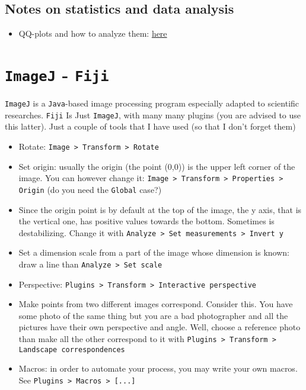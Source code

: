 \documentclass[a4paper,12pt,%
              final%
              ]{article}
\begin{document}
\subsection{Notes on statistics and data analysis}
\begin{itemize}
  \item QQ-plots and how to analyze them: \href{https://www.ucd.ie/ecomodel/Resources/QQplots_WebVersion.html}{here}
\end{itemize}
\section{\texttt{ImageJ} - \texttt{Fiji}}
\texttt{ImageJ} is a \texttt{Java}-based image processing program especially adapted to scientific researches. \texttt{Fiji} Is Just \texttt{ImageJ}, with many many plugins (you are advised to use this latter). Just a couple of tools that I have used (so that I don't forget them)
\begin{itemize}
  \item Rotate: \texttt{Image > Transform > Rotate}
  \item Set origin: usually the origin (the point (0,0)) is the upper left corner of the image. You can however change it: \texttt{Image > Transform > Properties > Origin} (do you need the \texttt{Global} case?)
  \item Since the origin point is by default at the top of the image, the y axis, that is the vertical one, has positive values towards the bottom. Sometimes is destabilizing. Change it with \texttt{Analyze > Set measurements > Invert y}
  \item Set a dimension scale from a part of the image whose dimension is known: draw a line than \texttt{Analyze > Set scale}
  \item Perspective: \texttt{Plugins > Transform > Interactive perspective}
  \item Make points from two different images correspond. Consider this. You have some photo of the same thing but you are a bad photographer and all the pictures have their own perspective and angle. Well, choose a reference photo than make all the other correspond to it with \texttt{Plugins > Transform > Landscape correspondences}
  \item Macros: in order to automate your process, you may write your own macros. See \texttt{Plugins > Macros > [...]}
\end{itemize}
\end{document}

